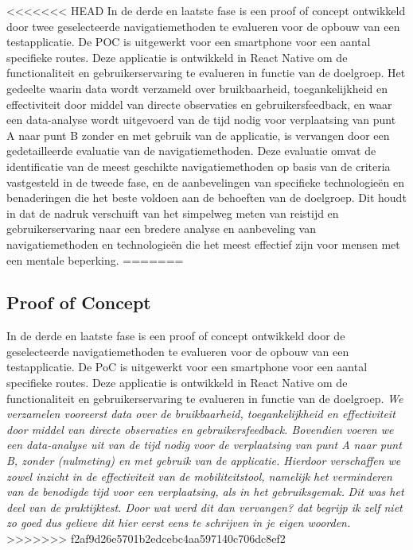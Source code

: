 <<<<<<< HEAD
In de derde en laatste fase is een proof of concept ontwikkeld door twee geselecteerde navigatiemethoden te evalueren voor de opbouw van een testapplicatie. De POC is uitgewerkt voor een smartphone voor een aantal specifieke routes. Deze applicatie is ontwikkeld in React Native om de functionaliteit en gebruikerservaring te evalueren in functie van de doelgroep. Het gedeelte waarin data wordt verzameld over bruikbaarheid, toegankelijkheid en effectiviteit door middel van directe observaties en gebruikersfeedback, en waar een data-analyse wordt uitgevoerd van de tijd nodig voor verplaatsing van punt A naar punt B zonder en met gebruik van de applicatie, is vervangen door een gedetailleerde evaluatie van de navigatiemethoden. Deze evaluatie omvat de identificatie van de meest geschikte navigatiemethoden op basis van de criteria vastgesteld in de tweede fase, en de aanbevelingen van specifieke technologieën en benaderingen die het beste voldoen aan de behoeften van de doelgroep. Dit houdt in dat de nadruk verschuift van het simpelweg meten van reistijd en gebruikerservaring naar een bredere analyse en aanbeveling van navigatiemethoden en technologieën die het meest effectief zijn voor mensen met een mentale beperking.
=======
\subsection*{Proof of Concept}


In de derde en laatste fase is een proof of concept ontwikkeld door de geselecteerde navigatiemethoden te evalueren voor de opbouw van een testapplicatie. De PoC is uitgewerkt voor een smartphone voor een aantal specifieke routes. Deze applicatie is ontwikkeld in React Native om de functionaliteit en gebruikerservaring te evalueren in functie van de doelgroep. \textit{We verzamelen vooreerst data over de bruikbaarheid, toegankelijkheid en effectiviteit door middel van directe observaties en gebruikersfeedback. Bovendien voeren we een data-analyse uit van de tijd nodig voor de verplaatsing van punt A naar punt B, zonder (nulmeting) en met gebruik van de applicatie. Hierdoor verschaffen we zowel inzicht in de effectiviteit van de mobiliteitstool, namelijk het verminderen van de benodigde tijd voor een verplaatsing, als in het gebruiksgemak.} \textit{Dit was het deel van de praktijktest. Door wat werd dit dan vervangen? dat begrijp ik zelf niet zo goed dus gelieve dit hier eerst eens te schrijven in je eigen woorden.}
>>>>>>> f2af9d26e5701b2edcebc4aa597140c706dc8ef2


